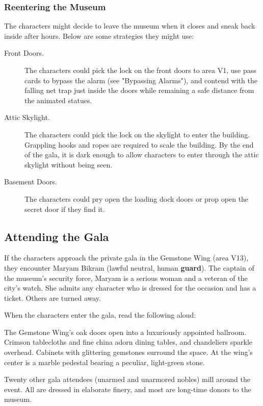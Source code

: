 \documentclass[10pt,a4paper,twoside,bg=print,twocolumn,openany,nodeprecatedcode]{dndbook}
\begin{document}
\subsubsection{Reentering the Museum}
The characters might decide to leave the museum when it closes and sneak back inside after hours. Below are some strategies they might use:


\begin{description}
\item[Front Doors.]
The characters could pick the lock on the front doors to area V1, use pass cards to bypass the alarm (see "Bypassing Alarms"), and contend with the falling net trap just inside the doors while remaining a safe distance from the animated statues.
\item[Attic Skylight.]
The characters could pick the lock on the skylight to enter the building. Grappling hooks and ropes are required to scale the building. By the end of the gala, it is dark enough to allow characters to enter through the attic skylight without being seen.
\item[Basement Doors.]
The characters could pry open the loading dock doors or prop open the secret door if they find it.
\end{description}

\subsection{Attending the Gala}
If the characters approach the private gala in the Gemstone Wing (area V13), they encounter Maryam Bikram (lawful neutral, human \textbf{guard}). The captain of the museum's security force, Maryam is a serious woman and a veteran of the city's watch. She admits any character who is dressed for the occasion and has a ticket. Others are turned away.

When the characters enter the gala, read the following aloud:

\begin{DndReadAloud}{}
The Gemstone Wing's oak doors open into a luxuriously appointed ballroom. Crimson tablecloths and fine china adorn dining tables, and chandeliers sparkle overhead. Cabinets with glittering gemstones surround the space. At the wing's center is a marble pedestal bearing a peculiar, light-green stone.

\end{DndReadAloud}

Twenty other gala attendees (unarmed and unarmored nobles) mill around the event. All are dressed in elaborate finery, and most are long-time donors to the museum.
\end{document}
